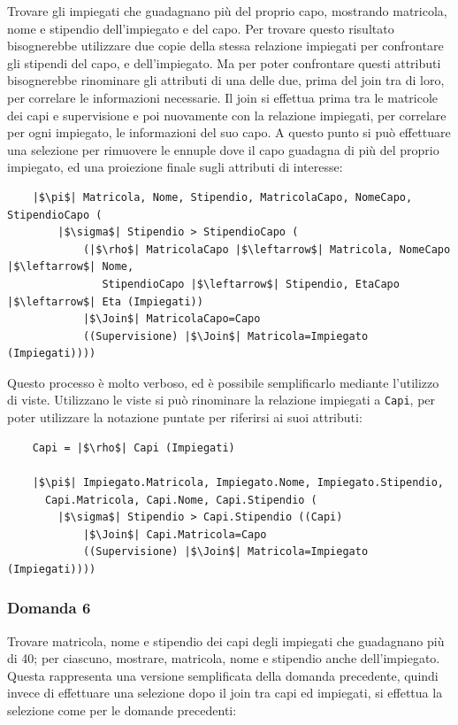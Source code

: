 \documentclass{article}
\numberwithin{equation}{subsection}
\begin{document}
Trovare gli impiegati che guadagnano più del proprio capo, mostrando matricola, nome e stipendio dell'impiegato e del capo. Per trovare questo risultato bisognerebbe utilizzare due copie della stessa relazione 
impiegati per confrontare gli stipendi del capo, e dell'impiegato. Ma per poter confrontare questi attributi bisognerebbe rinominare gli attributi di una delle due, prima del join tra di loro, per correlare 
le informazioni necessarie. Il join si effettua prima tra le matricole dei capi e supervisione e poi nuovamente con la relazione impiegati, per correlare per ogni impiegato, le informazioni del suo capo. A questo 
punto si può effettuare una selezione per rimuovere le ennuple dove il capo guadagna di più del proprio impiegato, ed una proiezione finale sugli attributi di interesse:

\begin{verbatim}
    |$\pi$| Matricola, Nome, Stipendio, MatricolaCapo, NomeCapo, StipendioCapo (
        |$\sigma$| Stipendio > StipendioCapo (
            (|$\rho$| MatricolaCapo |$\leftarrow$| Matricola, NomeCapo |$\leftarrow$| Nome, 
               StipendioCapo |$\leftarrow$| Stipendio, EtaCapo |$\leftarrow$| Eta (Impiegati))
            |$\Join$| MatricolaCapo=Capo
            ((Supervisione) |$\Join$| Matricola=Impiegato (Impiegati))))
\end{verbatim}


Questo processo è molto verboso, ed è possibile semplificarlo mediante l'utilizzo di viste. Utilizzano le viste si può rinominare la relazione impiegati a \verb|Capi|, per poter utilizzare la notazione puntate 
per riferirsi ai suoi attributi:
\begin{verbatim}
    Capi = |$\rho$| Capi (Impiegati) 

    |$\pi$| Impiegato.Matricola, Impiegato.Nome, Impiegato.Stipendio, 
      Capi.Matricola, Capi.Nome, Capi.Stipendio (
        |$\sigma$| Stipendio > Capi.Stipendio ((Capi)
            |$\Join$| Capi.Matricola=Capo
            ((Supervisione) |$\Join$| Matricola=Impiegato (Impiegati))))
\end{verbatim}

\subsubsection*{Domanda 6}

Trovare matricola, nome e stipendio dei capi degli impiegati che guadagnano più di 40; per ciascuno, mostrare, matricola, nome e stipendio anche dell'impiegato. Questa rappresenta una versione semplificata 
della domanda precedente, quindi invece di effettuare una selezione dopo il join tra capi ed impiegati, si effettua la selezione come per le domande precedenti:
\end{document}
